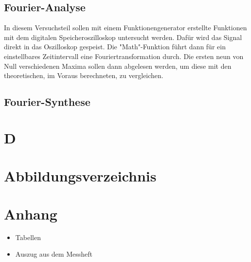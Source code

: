 \documentclass[11pt,ngerman,a4paper]{article}
\begin{document}
\subsection{Fourier-Analyse}
In diesem Versuchsteil sollen mit einem Funktionengenerator erstellte Funktionen mit dem digitalen Speicheroszilloskop untersucht werden. Dafür wird das Signal direkt in das Oszilloskop gespeist. Die "Math"-Funktion führt dann für ein einstellbares Zeitintervall eine Fouriertransformation durch. Die ersten neun von Null verschiedenen Maxima sollen dann abgelesen werden, um diese mit den theoretischen, im Voraus berechneten, zu vergleichen.
\subsection{Fourier-Synthese}

\section{D}
\section{Abbildungsverzeichnis}
\section{Anhang}
\begin{itemize}
\item Tabellen
\item Auszug aus dem Messheft
\end{itemize}

\newpage
\end{document}
